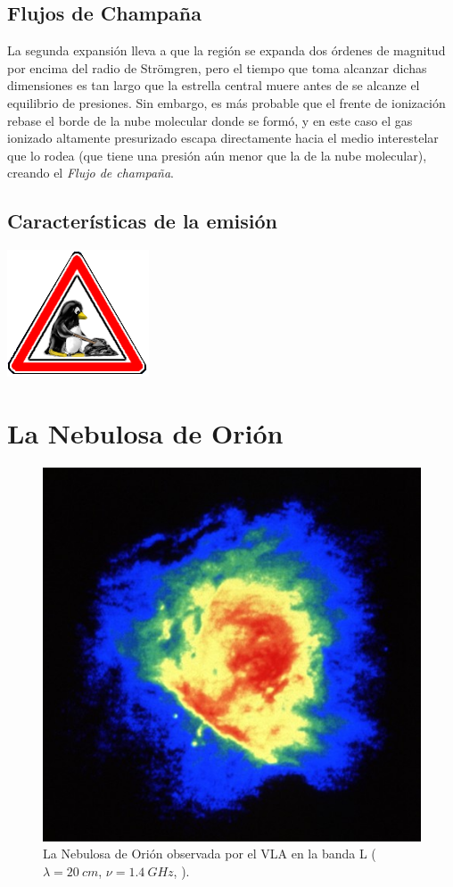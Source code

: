 \subsection{Flujos de Champaña}
La segunda expansión lleva a que la región  se expanda dos órdenes de magnitud por encima del radio de Strömgren, pero el tiempo que toma alcanzar dichas dimensiones es tan largo que la estrella central muere antes de se alcanze el equilibrio de presiones. Sin embargo, es más probable que el frente de ionización rebase el borde de la nube molecular donde se formó, y en este caso el gas ionizado altamente presurizado escapa directamente hacia el medio interestelar que lo rodea (que tiene una presión aún menor que la de la nube molecular), creando el \textit{Flujo de champaña}.

\subsection{Características de la emisión}

\includegraphics[width=0.1\linewidth]{./Figures/tux-development}


\section{La Nebulosa de Orión}

\begin{figure}
    \includegraphics[width=0.5\linewidth]{./Figures/OrionVR13A} 
  \caption{La Nebulosa de Orión observada por el VLA en la banda L ($\lambda = \SI{20}{cm}$, $\nu = \SI{1.4}{GHz}$, \citet{Yusef:1990}).}
\end{figure}

